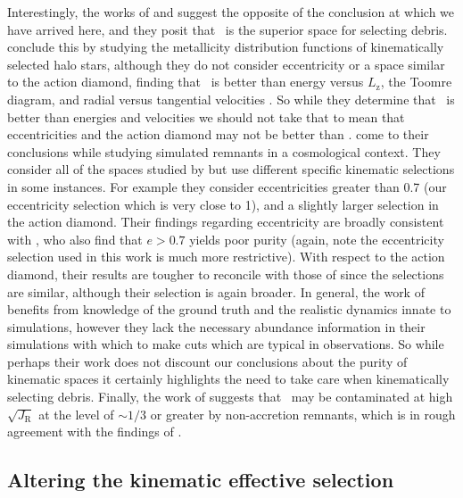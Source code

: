 Interestingly, the works of \textcite{feuillet20} and \parencite{carrillo23} suggest the opposite of the conclusion at which we have arrived here, and they posit that \JRLz\ is the superior space for selecting \gse debris. \textcite{feuillet20} conclude this by studying the metallicity distribution functions of kinematically selected halo stars, although they do not consider eccentricity or a space similar to the action diamond, finding that \JRLz\ is better than energy versus $L_\mathrm{z}$, the Toomre diagram, and radial versus tangential velocities \parencite[this is actually consistent with the conclusions of ][]{lane22}. So while they determine that \JRLz\ is better than energies and velocities we should not take that to mean that eccentricities and the action diamond may not be better than \JRLz. \textcite{carrillo23} come to their conclusions while studying simulated \gse remnants in a cosmological context. They consider all of the spaces studied by \cite{lane22} but use different specific kinematic selections in some instances. For example they consider eccentricities greater than 0.7 (our eccentricity selection which is very close to 1), and a slightly larger selection in the action diamond. Their findings regarding eccentricity are broadly consistent with \cite{lane22}, who also find that $e > 0.7$ yields poor purity (again, note the eccentricity selection used in this work is much more restrictive). With respect to the action diamond, their results are tougher to reconcile with those of \cite{lane22} since the selections are similar, although their selection is again broader. In general, the work of \textcite{carrillo23} benefits from knowledge of the ground truth and the realistic dynamics innate to simulations, however they lack the necessary abundance information in their simulations with which to make cuts which are typical in observations. So while perhaps their work does not discount our conclusions about the purity of kinematic spaces it certainly highlights the need to take care when kinematically selecting \gse debris. Finally, the work of \textcite{donlon23} suggests that \JRLz\ may be contaminated at high $\sqrt{J_\mathrm{R}}$ at the level of $\sim 1/3$ or greater by non-\gse accretion remnants, which is in rough agreement with the findings of \cite{lane22}.

\subsection{Altering the kinematic effective selection}
\label{subsec:altering-kinematic-effective-selection-function}

